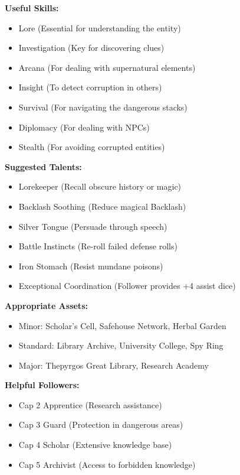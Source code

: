 \documentclass[11pt]{article}
\begin{document}
\textbf{Useful Skills:}
\begin{itemize}
    \item Lore (Essential for understanding the entity)
    \item Investigation (Key for discovering clues)
    \item Arcana (For dealing with supernatural elements)
    \item Insight (To detect corruption in others)
    \item Survival (For navigating the dangerous stacks)
    \item Diplomacy (For dealing with NPCs)
    \item Stealth (For avoiding corrupted entities)
\end{itemize}

\textbf{Suggested Talents:}
\begin{itemize}
    \item Lorekeeper (Recall obscure history or magic)
    \item Backlash Soothing (Reduce magical Backlash)
    \item Silver Tongue (Persuade through speech)
    \item Battle Instincts (Re-roll failed defense rolls)
    \item Iron Stomach (Resist mundane poisons)
    \item Exceptional Coordination (Follower provides +4 assist dice)
\end{itemize}

\textbf{Appropriate Assets:}
\begin{itemize}
    \item Minor: Scholar's Cell, Safehouse Network, Herbal Garden
    \item Standard: Library Archive, University College, Spy Ring
    \item Major: Thepyrgos Great Library, Research Academy
\end{itemize}

\textbf{Helpful Followers:}
\begin{itemize}
    \item Cap 2 Apprentice (Research assistance)
    \item Cap 3 Guard (Protection in dangerous areas)
    \item Cap 4 Scholar (Extensive knowledge base)
    \item Cap 5 Archivist (Access to forbidden knowledge)
\end{itemize}
\end{document}
